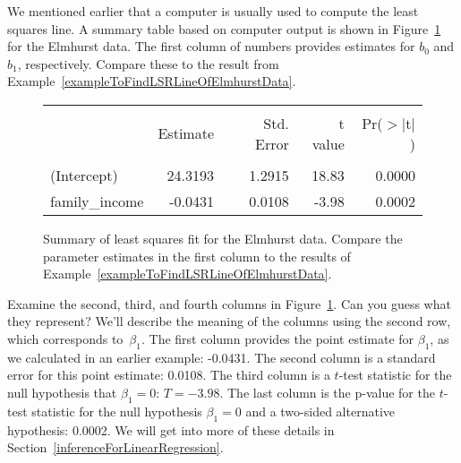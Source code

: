 We mentioned earlier that a computer is usually used to compute the least squares line. A summary table based on computer output is shown in Figure~\ref{rOutputForIncomeAidLSRLine} for the Elmhurst data. The first column of numbers provides estimates for ${b}_0$ and ${b}_1$, respectively. Compare these to the result from Example~\ref{exampleToFindLSRLineOfElmhurstData}.

\begin{figure}[ht]
\centering
\begin{tabular}{l rrrr}
  \hline
  \vspace{-3.7mm} & & & & \\
 & Estimate & Std. Error & t value & Pr($>$$|$t$|$) \\ 
  \hline
  \vspace{-3.6mm} & & & & \\
(Intercept) & 24.3193 & 1.2915 & 18.83 & 0.0000 \\ 
family\_\hspace{0.3mm}income & -0.0431 & 0.0108 & -3.98 & 0.0002 \\ 
  \hline
\end{tabular}
\caption{Summary of least squares fit for the Elmhurst data. Compare the parameter estimates in the first column to the results of Example~\ref{exampleToFindLSRLineOfElmhurstData}.}
\label{rOutputForIncomeAidLSRLine}
\end{figure}

\begin{examplewrap}
\begin{nexample}{Examine the second, third, and fourth columns in Figure~\ref{rOutputForIncomeAidLSRLine}. Can you guess what they represent?}
We'll describe the meaning of the columns using the second row, which corresponds to~$\beta_1$. The first column provides the point estimate for $\beta_1$, as we calculated in an earlier example: -0.0431. The second column is a standard error for this point estimate: 0.0108. The third column is a $t$-test statistic for the null hypothesis that $\beta_1 = 0$: $T=-3.98$. The last column is the p-value for the $t$-test statistic for the null hypothesis $\beta_1=0$ and a two-sided alternative hypothesis: 0.0002. We will get into more of these details in Section~\ref{inferenceForLinearRegression}.
\end{nexample}
\end{examplewrap}

